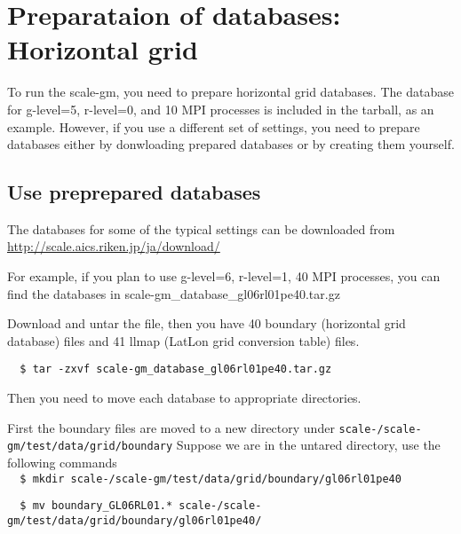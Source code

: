 \section{Preparataion of databases: Horizontal grid}

To run the scale-gm, you need to prepare horizontal grid databases. 
The database for g-level=5, r-level=0, and 10 MPI processes 
is included in the tarball, as an example.
However, if you use a different set of settings, you need to prepare databases 
either by donwloading prepared databases or by creating them yourself.


\subsection{Use preprepared databases}
The databases for some of the typical settings can be downloaded from 
\noindent \url{http://scale.aics.riken.jp/ja/download/}

For example, if you plan to use g-level=6, r-level=1, 40 MPI processes, 
you can find the databases in
scale-gm\_database\_gl06rl01pe40.tar.gz

Download and untar the file, then you have 40 boundary (horizontal grid database)
files and 41 llmap (LatLon
grid conversion table) files. 
\begin{verbatim}
  $ tar -zxvf scale-gm_database_gl06rl01pe40.tar.gz
\end{verbatim}

\noindent Then you need to move each database to appropriate directories.

\noindent First the boundary files are moved to a new directory under 
\texttt{scale-{\version}/scale-gm/test/data/grid/boundary}
Suppose we are in the untared directory, use the following commands
\\

\verb|  $ mkdir scale-|{\version}\verb|/scale-gm/test/data/grid/boundary/gl06rl01pe40|

\verb|  $ mv boundary_GL06RL01.* scale-|{\version}\verb|/scale-gm/test/data/grid/boundary/gl06rl01pe40/|
\\

